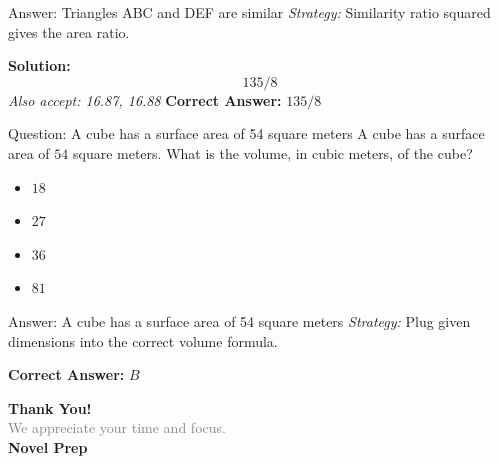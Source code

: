 \documentclass{beamer}
\begin{document}
\begin{frame}{Answer: Triangles ABC and DEF are similar}
\textit{Strategy:} Similarity ratio squared gives the area ratio.

\textbf{Solution:}
\[ \boxed{135/8} \]
\textit{Also accept: 16.87, 16.88}
\textbf{Correct Answer:} \( \boxed{135/8} \)

\end{frame}
\begin{frame}{Question: A cube has a surface area of 54 square meters}
A cube has a surface area of $54$ square meters.  
What is the volume, in cubic meters, of the cube?
\begin{itemize}
    \item[\textbf{A.}] $18$
    \item[\textbf{B.}] $27$
    \item[\textbf{C.}] $36$
    \item[\textbf{D.}] $81$
\end{itemize}
\end{frame}
\begin{frame}{Answer: A cube has a surface area of 54 square meters}
\textit{Strategy:} Plug given dimensions into the correct volume formula.

\textbf{Correct Answer:} \( \boxed{B} \)

\end{frame}

\begin{frame}{}
    \centering
    \vspace{5em}
    {\Huge \textbf{\textcolor{novelPurple}{Thank You!}}} \\[1em]
    {\large \textcolor{gray}{We appreciate your time and focus.}} \\[3em]
    {\LARGE \textbf{\textcolor{novelPurple}{\textsf{Novel Prep}}}}
    \vfill
\end{frame}
\end{document}
